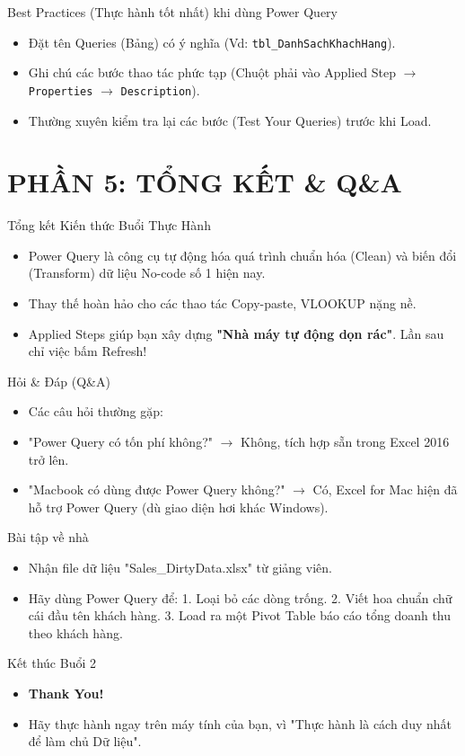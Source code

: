 \documentclass[aspectratio=169]{beamer}
\begin{document}
\begin{frame}{Best Practices (Thực hành tốt nhất) khi dùng Power Query}
    \begin{itemize}
        \item Đặt tên Queries (Bảng) có ý nghĩa (Vd: \texttt{tbl\_DanhSachKhachHang}).
        \item Ghi chú các bước thao tác phức tạp (Chuột phải vào Applied Step $\rightarrow$ \texttt{Properties} $\rightarrow$ \texttt{Description}).
        \item Thường xuyên kiểm tra lại các bước (Test Your Queries) trước khi Load.
    \end{itemize}
\end{frame}


\section{PHẦN 5: TỔNG KẾT \& Q\&A}


\begin{frame}{Tổng kết Kiến thức Buổi Thực Hành}
    \begin{itemize}
        \item Power Query là công cụ tự động hóa quá trình chuẩn hóa (Clean) và biến đổi (Transform) dữ liệu No-code số 1 hiện nay.
        \item Thay thế hoàn hảo cho các thao tác Copy-paste, VLOOKUP nặng nề.
        \item Applied Steps giúp bạn xây dựng \textbf{"Nhà máy tự động dọn rác"}. Lần sau chỉ việc bấm Refresh!
    \end{itemize}
\end{frame}


\begin{frame}{Hỏi \& Đáp (Q\&A)}
    \begin{itemize}
        \item Các câu hỏi thường gặp:
        \item "Power Query có tốn phí không?" $\rightarrow$ Không, tích hợp sẵn trong Excel 2016 trở lên.
        \item "Macbook có dùng được Power Query không?" $\rightarrow$ Có, Excel for Mac hiện đã hỗ trợ Power Query (dù giao diện hơi khác Windows).
    \end{itemize}
\end{frame}


\begin{frame}{Bài tập về nhà}
    \begin{itemize}
        \item Nhận file dữ liệu "Sales\_DirtyData.xlsx" từ giảng viên.
        \item Hãy dùng Power Query để:
        1. Loại bỏ các dòng trống.
        2. Viết hoa chuẩn chữ cái đầu tên khách hàng.
        3. Load ra một Pivot Table báo cáo tổng doanh thu theo khách hàng.
    \end{itemize}
\end{frame}


\begin{frame}{Kết thúc Buổi 2}
    \begin{itemize}
        \item \begin{center} \Huge \textbf{Thank You!} \end{center}
        \item Hãy thực hành ngay trên máy tính của bạn, vì "Thực hành là cách duy nhất để làm chủ Dữ liệu".
    \end{itemize}
\end{frame}
\end{document}

